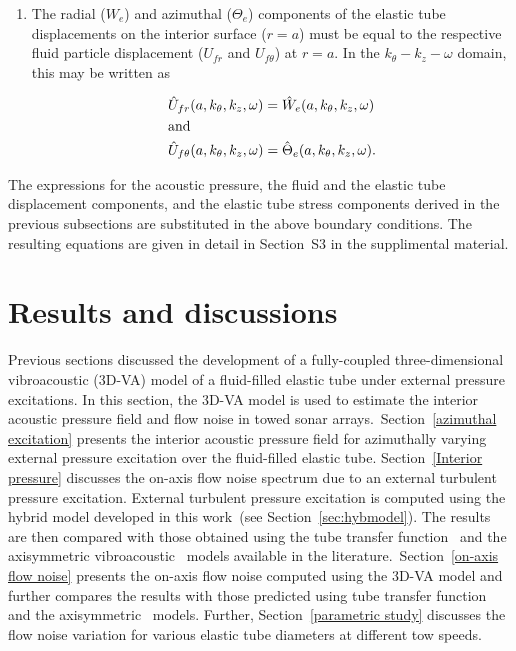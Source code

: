 \documentclass[11pt,cleanfoot]{asme2ej}
\begin{document}
\begin{enumerate}
     \item The radial ($W_e$) and azimuthal ($\Theta_e$) components of the elastic tube displacements on the interior surface ($r=a$) must be equal to the respective fluid particle displacement ($U_{fr}$ and $U_{f\theta}$) at $r=a$. In the $k_\theta-k_z-\omega$ domain, this may be written as

     \begin{align}
        &\Hat{U}_{fr}(a,k_\theta,k_{z},\omega) = \Hat{W}_{e}(a,k_\theta,k_{z},\omega)\label{BC9 3d}\\ 
    &\text{and} \nonumber \\
        &\Hat{U}_{f\theta}(a,k_\theta,k_{z},\omega) = \Hat{\Theta}_{e}(a,k_\theta,k_{z},\omega)\label{BC10 3d}.
    \end{align}
    \end{enumerate}
The expressions for the acoustic pressure, the fluid and the elastic tube displacement components, and the elastic tube stress components derived in the previous subsections are substituted in the above boundary conditions. The resulting equations are given in detail in Section~S3 in the supplimental material.


\section{Results and discussions}\label{sec:results}
Previous sections discussed the development of a fully-coupled three-dimensional vibroacoustic (3D-VA) model of a fluid-filled elastic tube under external pressure excitations. In this section, the 3D-VA model is used to estimate the interior acoustic pressure field and flow noise in towed sonar arrays.~Section~\ref{azimuthal excitation} presents the interior acoustic pressure field for azimuthally varying external pressure excitation over the fluid-filled elastic tube. Section~\ref{Interior pressure} discusses the on-axis flow noise spectrum due to an external turbulent pressure excitation. External turbulent pressure excitation is computed using the hybrid model developed in this work~(see Section~\ref{sec:hybmodel}). The results are then compared with those obtained using the tube transfer function~\cite{knight1996} and the axisymmetric vibroacoustic~\cite{jineesh2013,Rakesh2024} models available in the literature.~Section~\ref{on-axis flow noise} presents the on-axis flow noise computed using the 3D-VA model and further compares the results with those predicted using tube transfer function~\cite{knight1996} and the axisymmetric~\cite{jineesh2013} models. Further, Section~\ref{parametric study} discusses the flow noise variation for various elastic tube diameters at different tow speeds.
\end{document}
